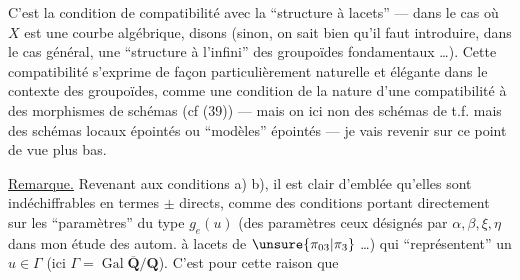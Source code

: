 C'est la condition de compatibilité avec la ``structure à lacets'' --- dans le cas où $X$ est une courbe algébrique, disons (sinon, on sait bien qu'il faut introduire, dans le cas général, une ``structure à l'infini'' des groupoïdes fondamentaux \ldots). \margin{$\Vert$} Cette compatibilité  s'exprime de façon particulièrement naturelle et élégante dans le contexte des groupoïdes, \unsure{$\{$} comme une condition de la nature d'une compatibilité à des morphismes de schémas (cf (39)) --- mais on  ici non des schémas de t.f. mais des schémas locaux épointés ou ``modèles'' épointés --- je vais revenir sur ce point de vue plus bas.

\uline{Remarque.} Revenant aux conditions a) b), il est clair d'emblée qu'elles sont indéchiffrables  en termes $\pm$ directs, comme des conditions portant directement sur les ``paramètres'' du type $g_e(u)$ (des paramètres   ceux désignés par $\alpha,\beta,\xi,\eta$ dans mon étude des autom. à lacets de $\unsure{\pi_{03}|\pi_3}$ \ldots) qui ``représentent'' un $u\in\Gamma$ (ici $\Gamma=\operatorname{Gal}\overline{\mathbf{Q}}/\mathbf{Q}$).  C'est pour cette raison que 
